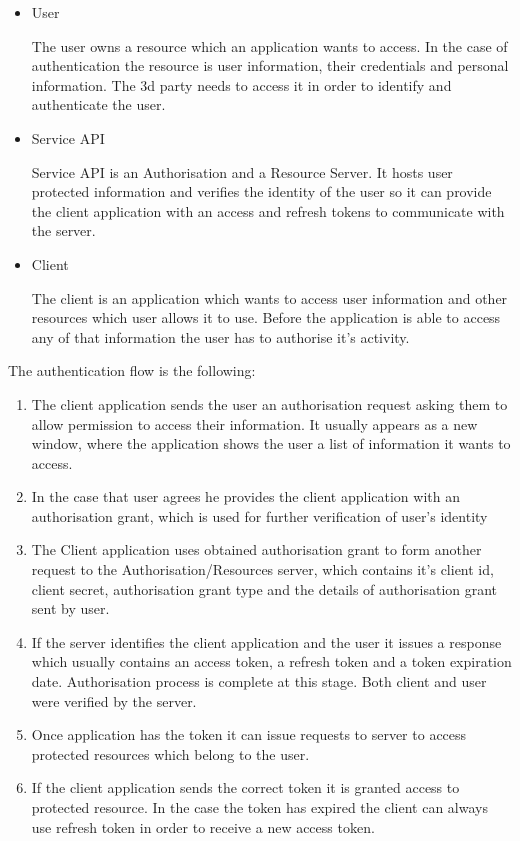 \documentclass[thesis=M,english]{FITthesis}[2012/10/20]
\begin{document}
\begin{itemize}


\item User

The user owns a resource which an application wants to access. In the case of authentication the resource is user information, their credentials and personal information. The 3d party needs to access it in order to identify and authenticate the user.

\item Service API

Service API is an Authorisation and a Resource Server. It hosts user protected information and verifies the identity of the user so it can provide the client application with an access and refresh tokens to communicate with the server.

\item Client

The client is an application which wants to access user information and other resources which user allows it to use. Before the application is able to access any of that information the user has to authorise it's activity.

\end{itemize}

The authentication flow is the following:

\begin{enumerate}
\item The client application sends the user an authorisation request asking them to allow permission to access their information. It usually appears as a new window, where the application shows the user a list of information it wants to access.
\item In the case that user agrees he provides the client application with an authorisation grant, which is used for further verification of user's identity
\item The Client application uses obtained authorisation grant to form another request to the Authorisation/Resources server, which contains it's client id, client secret, authorisation grant type and the details of authorisation grant sent by user.
\item If the server identifies the client application and the user it issues a response which usually contains an access token, a refresh token and a token expiration date. Authorisation process is complete at this stage. Both client and user were verified by the server.
\item Once application has the token it can issue requests to server to access protected resources which belong to the user.
\item If the client application sends the correct token it is granted access to protected resource. In the case the token has expired the client can always use refresh token in order to receive a new access token.
\end{enumerate}
\end{document}
